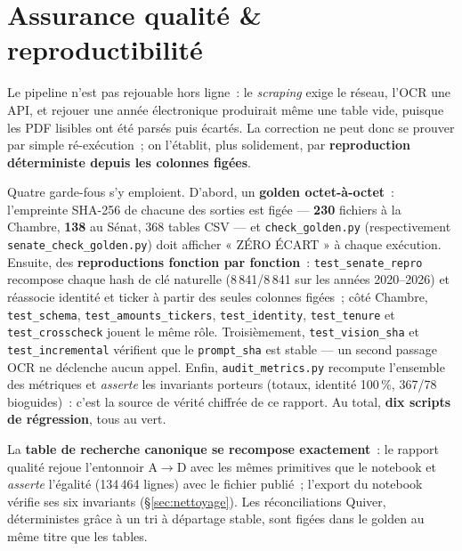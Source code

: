 \documentclass[11pt,a4paper]{article}
\newcommand{\co}[1]{\texttt{\small #1}}
\begin{document}
\section{Assurance qualité \& reproductibilité}
\label{sec:repro}

Le pipeline n'est pas rejouable hors ligne~: le \emph{scraping} exige le réseau, l'OCR une API, et rejouer
une année électronique produirait même une table vide, puisque les PDF lisibles ont été parsés puis
écartés. La correction ne peut donc se prouver par simple ré-exécution~; on l'établit, plus solidement, par
\textbf{reproduction déterministe depuis les colonnes figées}.

Quatre garde-fous s'y emploient. D'abord, un \textbf{golden octet-à-octet}~: l'empreinte SHA-256 de chacune
des sorties est figée — \textbf{230} fichiers à la Chambre, \textbf{138} au Sénat, 368 tables CSV — et
\co{check_golden.py} (respectivement \co{senate_check_golden.py}) doit afficher « ZÉRO ÉCART » à chaque
exécution. Ensuite, des \textbf{reproductions fonction par fonction}~: \co{test_senate_repro} recompose
chaque hash de clé naturelle (8\,841/8\,841 sur les années 2020--2026) et réassocie identité et ticker à
partir des seules colonnes figées~; côté Chambre, \co{test_schema}, \co{test_amounts_tickers},
\co{test_identity}, \co{test_tenure} et \co{test_crosscheck} jouent le même rôle. Troisièmement,
\co{test_vision_sha} et \co{test_incremental} vérifient que le \co{prompt_sha} est stable — un second
passage OCR ne déclenche aucun appel. Enfin, \co{audit_metrics.py} recompute l'ensemble des métriques et
\emph{asserte} les invariants porteurs (totaux, identité 100\,\%, 367/78 bioguides)~: c'est la source de
vérité chiffrée de ce rapport. Au total, \textbf{dix scripts de régression}, tous au vert.

La \textbf{table de recherche canonique se recompose exactement}~: le rapport qualité rejoue l'entonnoir
A$\rightarrow$D avec les mêmes primitives que le notebook et \emph{asserte} l'égalité (134\,464 lignes)
avec le fichier publié~; l'export du notebook vérifie ses six invariants (\S{}\ref{sec:nettoyage}). Les
réconciliations Quiver, déterministes grâce à un tri à départage stable, sont figées dans le golden au même
titre que les tables.

\end{document}
